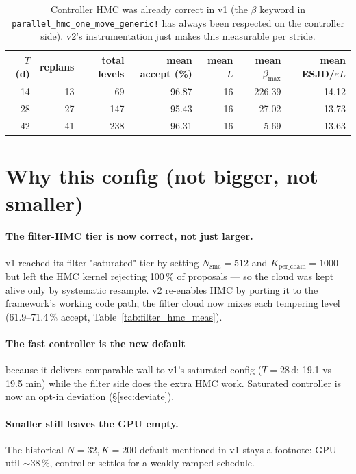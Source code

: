 \documentclass[11pt,a4paper]{article}
\begin{document}
\begin{table}[ht]
\centering
\footnotesize
\begin{tabular}{rrrrrrr}
\toprule
$T$ (d) & replans & total levels & mean accept (\%) & mean $L$ & mean $\beta_{\max}$ & mean ESJD/$\varepsilon L$ \\
\midrule
14 & 13 & 69  & 96.87 & 16 & 226.39 & 14.12 \\
28 & 27 & 147 & 95.43 & 16 &  27.02 & 13.73 \\
42 & 41 & 238 & 96.31 & 16 &   5.69 & 13.63 \\
\bottomrule
\end{tabular}
\caption{Controller HMC was already correct in v1 (the $\beta$
keyword in
\texttt{parallel\_hmc\_one\_move\_generic!} has always been
respected on the controller side). v2's instrumentation just makes
this measurable per stride.}
\label{tab:ctrl_hmc_meas}
\end{table}


\section{Why this config (not bigger, not smaller)}
\label{sec:why}

\paragraph{The filter-HMC tier is now correct, not just larger.}
v1 reached its filter "saturated" tier by setting $N_{\mathrm{smc}}
= 512$ and $K_{\mathrm{per\_chain}} = 1000$ but left the HMC
kernel rejecting 100\,\% of proposals --- so the cloud was kept
alive only by systematic resample. v2 re-enables HMC by porting it
to the framework's working code path; the filter cloud now mixes
each tempering level (61.9--71.4\,\% accept,
Table~\ref{tab:filter_hmc_meas}).

\paragraph{The fast controller is the new default} because it
delivers comparable wall to v1's saturated config
($T = 28$\,d: 19.1 vs 19.5 min) while the filter side does the
extra HMC work. Saturated controller is now an opt-in deviation
(\S\ref{sec:deviate}).

\paragraph{Smaller still leaves the GPU empty.} The historical
$N = 32, K = 200$ default mentioned in v1 stays a footnote: GPU
util $\sim 38\,\%$, controller settles for a weakly-ramped
schedule.
\end{document}
